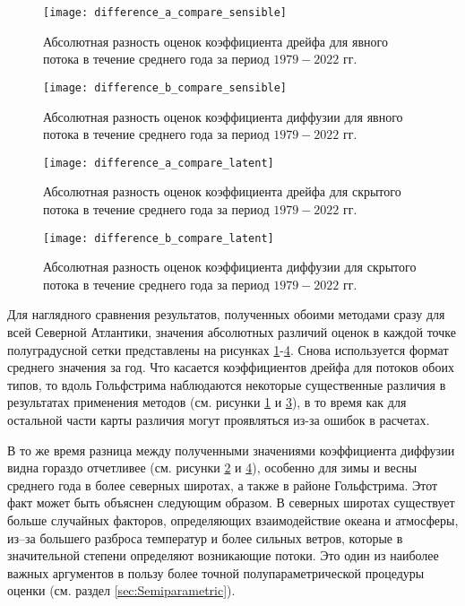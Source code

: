 \begin{figure}[!h]
	\centering
	\texttt{[image: difference\_a\_compare\_sensible]}
	\caption{Абсолютная разность оценок коэффициента дрейфа для явного потока в течение среднего года за период $1979-2022$ гг.} 
	\label{fig:sensible_difference_a}
\end{figure}


\begin{figure}[!h]
	\centering
	\texttt{[image: difference\_b\_compare\_sensible]}
	\caption{Абсолютная разность оценок коэффициента диффузии для явного потока в течение среднего года за период $1979-2022$ гг.} 
	\label{fig:sensible_difference_b}
\end{figure}

\begin{figure}[!h]
	\centering
	\texttt{[image: difference\_a\_compare\_latent]}
	\caption{Абсолютная разность оценок коэффициента дрейфа для скрытого потока в течение среднего года за период $1979-2022$ гг.} 
	\label{fig:latent_difference_a}
\end{figure}


\begin{figure}[!h]
	\centering
	\texttt{[image: difference\_b\_compare\_latent]}
	\caption{Абсолютная разность оценок коэффициента диффузии для скрытого потока в течение среднего года за период $1979-2022$ гг.} 
	\label{fig:latent_difference_b}
\end{figure}

Для наглядного сравнения результатов, полученных обоими методами сразу для всей Северной Атлантики, значения абсолютных различий оценок в каждой точке полуградусной сетки представлены на рисунках \ref{fig:sensible_difference_a}-\ref{fig:latent_difference_b}. Снова используется формат среднего значения за год.
Что касается коэффициентов дрейфа для потоков обоих типов, то вдоль Гольфстрима наблюдаются некоторые существенные различия в результатах применения методов (см. рисунки \ref{fig:sensible_difference_a} и \ref{fig:latent_difference_a}), в то время как для остальной части карты различия могут проявляться из-за ошибок в расчетах.

В то же время разница между полученными значениями коэффициента диффузии видна гораздо отчетливее (см. рисунки \ref{fig:sensible_difference_b} и \ref{fig:latent_difference_b}), особенно для зимы и весны среднего года в более северных широтах, а также в районе Гольфстрима. Этот факт может быть объяснен следующим образом. В северных широтах существует больше случайных факторов, определяющих взаимодействие океана и атмосферы, из–за большего разброса температур и более сильных ветров, которые в значительной степени определяют возникающие потоки. Это один из наиболее важных аргументов в пользу более точной полупараметрической процедуры оценки (см. раздел \ref{sec:Semiparametric}).

